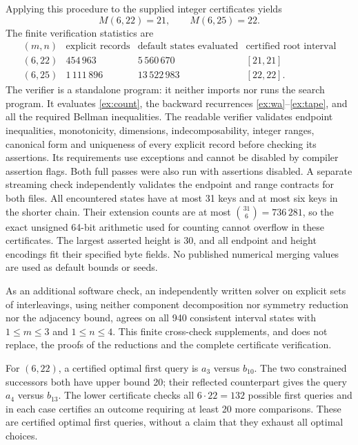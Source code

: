 \documentclass[11pt]{article}
\theoremstyle{definition}
\theoremstyle{remark}
\begin{document}
Applying this procedure to the supplied integer certificates yields
\begin{equation}\label{ex:results}
                         M(6,22)=21,
                 \qquad M(6,25)=22.
\end{equation}
The finite verification statistics are
\[
\begin{array}{c|r|r|c}
(m,n)&\text{explicit records}&\text{default states evaluated}
    &\text{certified root interval}\\\hline
(6,22)&454\,963&5\,560\,670&[21,21]\\
(6,25)&1\,111\,896&13\,522\,983&[22,22].
\end{array}
\]
The verifier is a standalone program: it neither imports nor runs the search
program.  It evaluates \eqref{ex:count}, the backward recurrences
\eqref{ex:wa}--\eqref{ex:tape}, and all the required Bellman inequalities.
The readable verifier validates endpoint inequalities, monotonicity,
dimensions, indecomposability, integer ranges, canonical form and uniqueness
of every explicit record before checking its assertions.  Its requirements
use exceptions and cannot be disabled by compiler assertion flags.  Both full
passes were also run with assertions disabled.  A separate streaming check
independently validates the endpoint and range contracts for both files.  All encountered states have at most 31 keys and at most
six keys in the shorter chain.  Their extension counts are at most
$\binom{31}{6}=736\,281$, so the exact unsigned 64-bit arithmetic used for
counting cannot overflow in these certificates.  The largest asserted height
is 30, and all endpoint and height encodings fit their specified byte fields.
No published numerical merging values are used as default bounds or seeds.

As an additional software check, an independently written solver on explicit
sets of interleavings, using neither component decomposition nor symmetry
reduction nor the adjacency bound, agrees on all 940 consistent interval
states with $1\le m\le3$ and $1\le n\le4$.  This finite cross-check supplements,
and does not replace, the proofs of the reductions and the complete
certificate verification.

For $(6,22)$, a certified optimal first query is $a_3$ versus $b_{10}$.
The two constrained successors both have upper bound 20; their reflected
counterpart gives the query $a_4$ versus $b_{13}$.  The lower certificate
checks all $6\cdot22=132$ possible first queries and in each case certifies
an outcome requiring at least 20 more comparisons.  These are certified
optimal first queries, without a claim that they exhaust all optimal choices.
\end{document}
